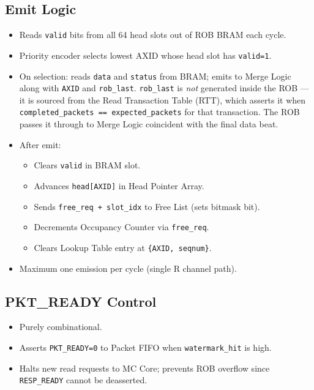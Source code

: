 \documentclass[11pt]{article}
\begin{document}
\subsection{Emit Logic}
\begin{itemize}[noitemsep]
  \item Reads \texttt{valid} bits from all 64 head slots out of ROB BRAM each cycle.
  \item Priority encoder selects lowest AXID whose head slot has \texttt{valid=1}.
  \item On selection: reads \texttt{data} and \texttt{status} from BRAM; emits to Merge Logic
        along with \texttt{AXID} and \texttt{rob\_last}. \texttt{rob\_last} is \emph{not}
        generated inside the ROB — it is sourced from the Read Transaction Table (RTT), which
        asserts it when \texttt{completed\_packets == expected\_packets} for that transaction.
        The ROB passes it through to Merge Logic coincident with the final data beat.
  \item After emit:
    \begin{itemize}[noitemsep]
      \item Clears \texttt{valid} in BRAM slot.
      \item Advances \texttt{head[AXID]} in Head Pointer Array.
      \item Sends \texttt{free\_req + slot\_idx} to Free List (sets bitmask bit).
      \item Decrements Occupancy Counter via \texttt{free\_req}.
      \item Clears Lookup Table entry at \texttt{\{AXID, seqnum\}}.
    \end{itemize}
  \item Maximum one emission per cycle (single R channel path).
\end{itemize}

\subsection{PKT\_READY Control}
\begin{itemize}[noitemsep]
  \item Purely combinational.
  \item Asserts \texttt{PKT\_READY=0} to Packet FIFO when \texttt{watermark\_hit} is high.
  \item Halts new read requests to MC Core; prevents ROB overflow since \texttt{RESP\_READY} cannot be deasserted.
\end{itemize}
\end{document}
